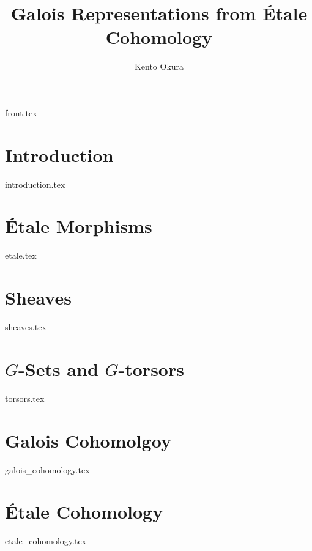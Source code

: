 \documentclass[11pt, openany]{memoir}
\title{Galois Representations from \'Etale Cohomology}
\author{Kento Okura}
\begin{document}
\frontmatter
{front.tex}

\mainmatter
\chapter{Introduction}
{introduction.tex}

\chapter{\'Etale Morphisms}
{etale.tex}

\chapter{Sheaves}
{sheaves.tex}

\chapter{$G$-Sets and $G$-torsors}
{torsors.tex}

\chapter{Galois Cohomolgoy}
{galois_cohomology.tex}

\chapter{\'Etale Cohomology}
{etale_cohomology.tex}



\end{document}
